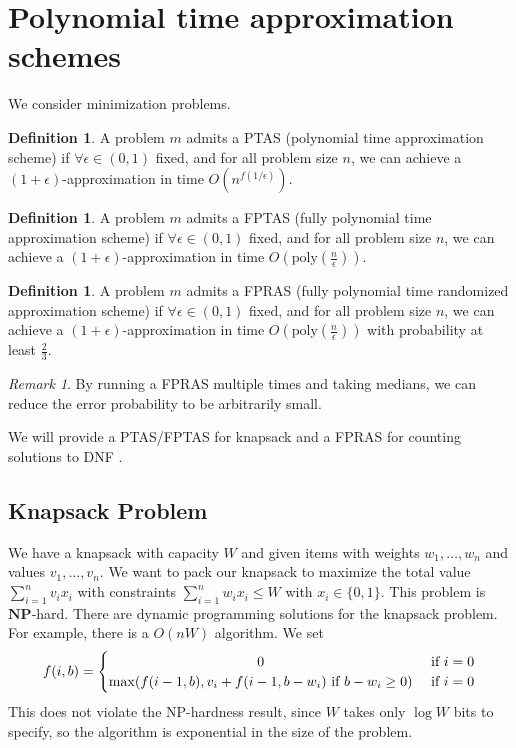 \documentclass[11pt]{article}
\theoremstyle{definition}
\newtheorem{definition}[theorem]{Definition}
\theoremstyle{remark}
\newtheorem{remark}[theorem]{Remark}
\begin{document}
\section{Polynomial time approximation schemes}
We consider minimization problems.
\begin{definition}
    A problem $m$ admits a PTAS (polynomial time approximation scheme)
    if $\forall \epsilon \in (0, 1)$ fixed,
    and for all problem size $n$,
    we can achieve a $(1+\epsilon)$-approximation in time $O(n^{f(1/\epsilon)})$.
\end{definition}
\begin{definition}
    A problem $m$ admits a FPTAS (fully polynomial time approximation scheme)
    if $\forall \epsilon \in (0, 1)$ fixed,
    and for all problem size $n$,
    we can achieve a $(1+\epsilon)$-approximation in time $O\left(\mathrm{poly}\left(\frac{n}{\epsilon}\right)\right)$.
\end{definition}
\begin{definition}
    A problem $m$ admits a FPRAS (fully polynomial time randomized approximation scheme)
    if $\forall \epsilon \in (0, 1)$ fixed,
    and for all problem size $n$,
    we can achieve a $(1+\epsilon)$-approximation in time $O\left(\mathrm{poly}\left(\frac{n}{\epsilon}\right)\right)$
    with probability at least $\frac{2}{3}$.
\end{definition}
\begin{remark}
    By running a FPRAS multiple times and taking medians,
    we can reduce the error probability to be arbitrarily small.
\end{remark}

We will provide a PTAS/FPTAS for knapsack and a FPRAS for counting solutions to DNF \cite{KarpJA89}.

\subsection{Knapsack Problem}
We have a knapsack with capacity $W$
and given items with weights $w_1, \ldots, w_n$ and values $v_1, \ldots, v_n$.
We want to pack our knapsack to maximize the total value $\sum_{i=1}^n v_i x_i$
with constraints $\sum_{i=1}^n w_i x_i \leq W$ with $x_i \in \{0, 1\}$.
This problem is $\mathbf{NP}$-hard.
There are dynamic programming solutions for the knapsack problem.
For example, there is a $O(nW)$ algorithm.
We set \[
    f(i, b) = 
    \begin{cases}
        \hfill 0 \hfill & \text{ if $i=0$} \\
        \hfill \max(f(i-1, b), v_i+f(i-1, b-w_i) \text{ if $b-w_i$} \geq 0) \hfill & \text{ if $i=0$}
    \end{cases}
\]
This does not violate the NP-hardness result, since $W$ takes only $\log W$ bits to specify,
so the algorithm is exponential in the size of the problem.
\end{document}
